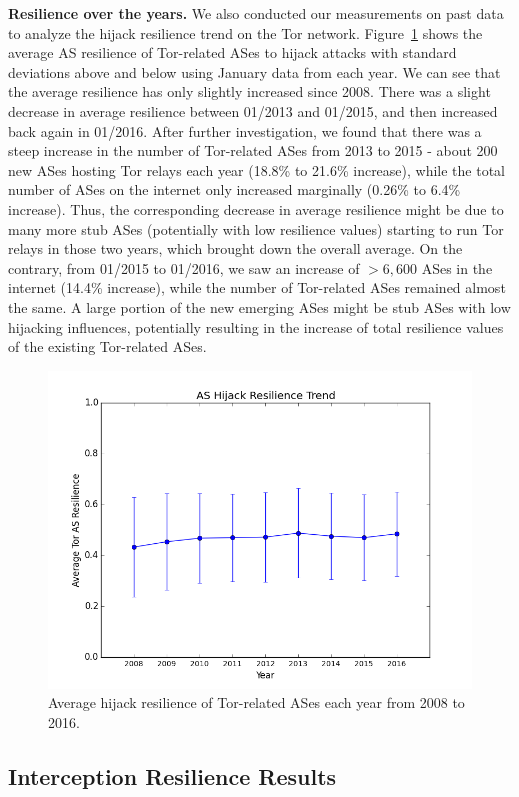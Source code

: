 {\bf Resilience over the years.} We also conducted our measurements on past data to analyze the hijack resilience trend on the Tor network.  Figure~\ref{fig:resilience_trend} shows the average AS resilience of Tor-related ASes to hijack attacks with standard deviations above and below using January data from each year.  We can see that the average resilience has only slightly increased since 2008.  There was a slight decrease in average resilience between 01/2013 and 01/2015, and then increased back again in 01/2016. After further investigation, we found that there was a steep increase in the number of Tor-related ASes from 2013 to 2015 - about 200 new ASes hosting Tor relays each year (18.8\% to 21.6\% increase), while the total number of ASes on the internet only increased marginally (0.26\% to 6.4\% increase). Thus, the corresponding decrease in average resilience might be due to many more stub ASes (potentially with low resilience values) starting to run Tor relays in those two years, which brought down the overall average. On the contrary, from 01/2015 to 01/2016, we saw an increase of $>6,600$ ASes in the internet (14.4\% increase), while the number of Tor-related ASes remained almost the same. A large portion of the new emerging ASes might be stub ASes with low hijacking influences, potentially resulting in the increase of total resilience values of the existing Tor-related ASes. 

\begin{figure}[ht!]
\centering
\includegraphics[width=.4\textwidth]{figure/new_longitudinal}
\caption{Average hijack resilience of Tor-related ASes each year from 2008 to 2016.}
\label{fig:resilience_trend}
\end{figure}

\subsection{Interception Resilience Results}

